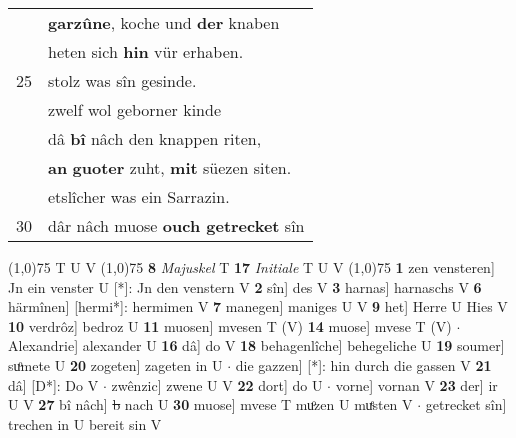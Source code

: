\documentclass[8pt,a4paper,notitlepage]{article}
\begin{document}
\begin{table}[ht]
\begin{minipage}[t]{0.5\linewidth}
\begin{tabular}{rl}
 & \textbf{garzûne}, koche und \textbf{der} knaben\\ 
 & heten sich \textbf{hin} vür erhaben.\\ 
25 & stolz was sîn gesinde.\\ 
 & zwelf wol geborner kinde\\ 
 & dâ \textbf{bî} nâch den knappen riten,\\ 
 & \textbf{an} \textbf{guoter} zuht, \textbf{mit} süezen siten.\\ 
 & etslîcher was ein Sarrazin.\\ 
30 & dâr nâch muose \textbf{ouch getrecket} sîn\\ 
\end{tabular}
\scriptsize
\line(1,0){75} \newline
T U V \newline
\line(1,0){75} \newline
\textbf{8} \textit{Majuskel} T  \textbf{17} \textit{Initiale} T U V  \newline
\line(1,0){75} \newline
\textbf{1} zen vensteren] Jn ein venster U [*]: Jn den venstern V \textbf{2} sîn] des V \textbf{3} harnas] harnaschs V \textbf{6} härmînen] [hermi*]: hermimen V \textbf{7} manegen] maniges U V \textbf{9} het] Herre U Hies V \textbf{10} verdrôz] bedroz U \textbf{11} muosen] mvesen T (V) \textbf{14} muose] mvese T (V)  $\cdot$ Alexandrie] alexander U \textbf{16} dâ] do V \textbf{18} behagenlîche] behegeliche U \textbf{19} soumer] suͦmete U \textbf{20} zogeten] zageten in U  $\cdot$ die gazzen] [*]: hin durch die gassen V \textbf{21} dâ] [D*]: Do V  $\cdot$ zwênzic] zwene U V \textbf{22} dort] do U  $\cdot$ vorne] vornan V \textbf{23} der] ir U V \textbf{27} bî nâch] \sout{b} nach U \textbf{30} muose] mvese T muͦzen U muͤsten V  $\cdot$ getrecket sîn] trechen in U bereit sin V \newline
\end{minipage}
\end{table}
\end{document}
